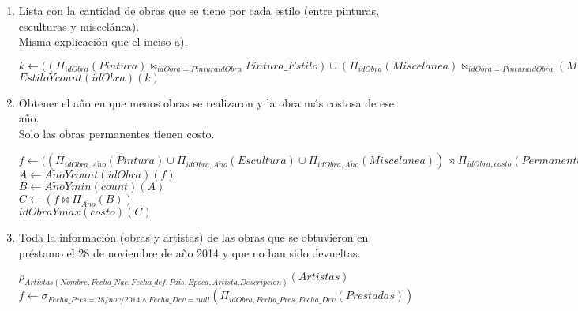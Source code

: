 \documentclass{article}
\begin{document}
\begin{enumerate}
\begin{enumerate}
					$j \leftarrow ((\Pi_{idObra, ArtistasNombre}(Pintura)\bowtie_{ArtistasNombre=Nombre})\Pi_{Nombre}(Artista)) \cup (\Pi_{idObra, ArtistasNombre}(Escultura)\bowtie_{ArtistasNombre=Nombre}\Pi_{Nombre}(Artista)) \cup (\Pi_{idObra, ArtistasNombre}(Miscelanea) \bowtie_{ArtistasNombre=Nombre} \Pi_{Nombre}(Artista)$\\
					
					$Nombre Y count(idObra)(j)$
						
				\item Lista con la cantidad de obras que se tiene por cada estilo (entre pinturas, esculturas y
				miscelánea).\\
														
				Misma explicación que el inciso a).
				
				$k \leftarrow ((\Pi_{idObra}(Pintura) \bowtie_{idObra=PinturaidObra} Pintura\_Estilo) \cup (\Pi_{idObra}(Miscelanea) \bowtie_{idObra=PinturaidObra} (Miscelanea_Estilo))$\\
				
				$EstiloYcount(idObra)(k)$
										
				\item Obtener el año en que menos obras se realizaron y la obra más costosa de ese año.\\
				
				Solo las obras permanentes tienen costo.
				
				$f \leftarrow ((\Pi_{idObra, A\tilde{n}o}(Pintura) \cup \Pi_{idObra, A\tilde{n}o}(Escultura) \cup \Pi_{idObra, A\tilde{n}o}(Miscelanea)) \bowtie \Pi_{idObra, costo}(Permanentes)$\\
				
				$A \leftarrow A\tilde{n}oYcount(idObra)(f)$\\
				$B \leftarrow A\tilde{n}oYmin(count)(A)$\\
				$C \leftarrow (f \bowtie \Pi_{A\tilde{n}o}(B))$\\
				$idObraYmax(costo)(C)$\\
				
				\item Toda la información (obras y artistas) de las obras que se obtuvieron en préstamo el 28 de
				noviembre de año 2014 y que no han sido devueltas.
				
				$\rho_{Artistas(Nombre, Fecha\_Nac, Fecha\_def, Pais, Epoca, Artista.Descripcion)}(Artistas)$			
				$f \leftarrow \sigma_{Fecha\_Pres = 28/nov/2014 \land Fecha\_Dev = null}(\Pi_{idObra, Fecha\_Pres, Fecha\_Dev}(Prestadas))$
				

\end{enumerate}
\end{enumerate}
\end{document}
